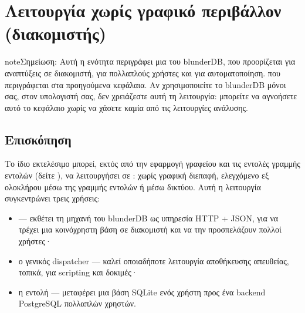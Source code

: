 \documentclass[letterpaper,10pt,greek]{sphinxmanual}
\begin{document}
\sphinxstepscope


\section{Λειτουργία χωρίς γραφικό περιβάλλον (διακομιστής)}
\label{\detokenize{mode_headless:mode-headless-serveur}}\label{\detokenize{mode_headless:headless}}\label{\detokenize{mode_headless::doc}}
\begin{sphinxadmonition}{note}{Σημείωση:}
\sphinxAtStartPar
Αυτή η ενότητα περιγράφει μια  του blunderDB, που προορίζεται για αναπτύξεις σε διακομιστή, για πολλαπλούς χρήστες και για αυτοματοποίηση.  που περιγράφεται στα προηγούμενα κεφάλαια. Αν χρησιμοποιείτε το blunderDB μόνοι σας, στον υπολογιστή σας, δεν χρειάζεστε αυτή τη λειτουργία: μπορείτε να αγνοήσετε αυτό το κεφάλαιο χωρίς να χάσετε καμία από τις λειτουργίες ανάλυσης.
\end{sphinxadmonition}


\subsection{Επισκόπηση}
\label{\detokenize{mode_headless:vue-d-ensemble}}
\sphinxAtStartPar
Το ίδιο εκτελέσιμο  μπορεί, εκτός από την εφαρμογή γραφείου και τις εντολές γραμμής εντολών (δείτε {\hyperref[\detokenize{cli:cli}]{}}), να λειτουργήσει σε : χωρίς γραφική διεπαφή, ελεγχόμενο εξ ολοκλήρου μέσω της γραμμής εντολών ή μέσω δικτύου. Αυτή η λειτουργία συγκεντρώνει τρεις χρήσεις:
\begin{itemize}
\item {} 
\sphinxAtStartPar
{}  — εκθέτει τη μηχανή του blunderDB ως υπηρεσία HTTP + JSON, για να τρέχει μια κοινόχρηστη βάση σε διακομιστή και να την προσπελάζουν πολλοί χρήστες·

\item {} 
\sphinxAtStartPar
ο γενικός dispatcher  — καλεί οποιαδήποτε λειτουργία αποθήκευσης απευθείας, τοπικά, για scripting και δοκιμές·

\item {} 
\sphinxAtStartPar
η εντολή  — μεταφέρει μια βάση SQLite ενός χρήστη προς ένα backend PostgreSQL πολλαπλών χρηστών.

\end{itemize}
\end{document}
